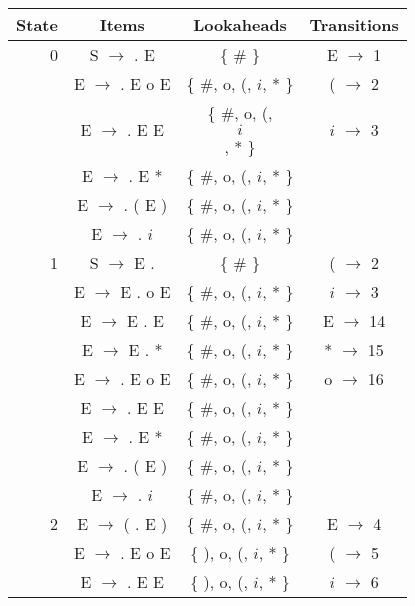 \begin{center}
    \centering
    \begin{longtable}{r|ccc}

\toprule
State &       Items        &         Lookaheads          &  Transitions  \\
\hline
0     &  S $\rightarrow$ . E          & \{ \# \}                       &   E   $\rightarrow$  1   \\
      &  E $\rightarrow$ . E o E    & \{ \#, o, (, $i$, * \}   &  (  $\rightarrow$  2   \\
      &  E $\rightarrow$ . E E        & \{ \#, o, (, $$i$$, * \}   &  $i$  $\rightarrow$  3   \\
      &  E $\rightarrow$ . E *      & \{ \#, o, (, $i$, * \}   &               \\
      &  E $\rightarrow$ . ( E )  & \{ \#, o, (, $i$, * \}   &               \\
      &  E $\rightarrow$ . $i$        & \{ \#, o, (, $i$, * \}   &               \\
\hline
1     &  S $\rightarrow$ E .          & \{ \# \}                       &  (  $\rightarrow$  2   \\
      &  E $\rightarrow$ E . o E    & \{ \#, o, (, $i$, * \}   &  $i$  $\rightarrow$  3   \\
      &  E $\rightarrow$ E . E        & \{ \#, o, (, $i$, * \}   &   E   $\rightarrow$  14  \\
      &  E $\rightarrow$ E . *      & \{ \#, o, (, $i$, * \}   &  *  $\rightarrow$  15  \\
      &  E $\rightarrow$ . E o E    & \{ \#, o, (, $i$, * \}   &  o  $\rightarrow$  16  \\
      &  E $\rightarrow$ . E E        & \{ \#, o, (, $i$, * \}   &               \\
      &  E $\rightarrow$ . E *      & \{ \#, o, (, $i$, * \}   &               \\
      &  E $\rightarrow$ . ( E )  & \{ \#, o, (, $i$, * \}   &               \\
      &  E $\rightarrow$ . $i$        & \{ \#, o, (, $i$, * \}   &               \\
\hline
2     &  E $\rightarrow$ ( . E )  & \{ \#, o, (, $i$, * \}   &   E   $\rightarrow$  4   \\
      &  E $\rightarrow$ . E o E    & \{ ), o, (, $i$, * \} &  (  $\rightarrow$  5   \\
      &  E $\rightarrow$ . E E        & \{ ), o, (, $i$, * \} &  $i$  $\rightarrow$  6   \\

\end{longtable}
\end{center}
